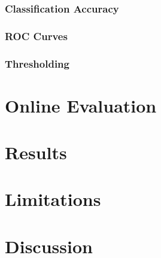 \subsubsection{Classification Accuracy}

\subsubsection{ROC Curves}

\subsubsection{Thresholding}

\section{Online Evaluation}

\section{Results}

\section{Limitations}

\section{Discussion}


